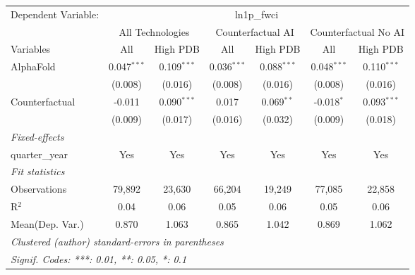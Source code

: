 \begingroup
\centering
\begin{tabular}{lcccccc}
   \tabularnewline \midrule \midrule
   Dependent Variable: & \multicolumn{6}{c}{ln1p\_fwci}\\
 & \multicolumn{2}{c}{All Technologies} & \multicolumn{2}{c}{Counterfactual AI} & \multicolumn{2}{c}{Counterfactual No AI} \\
\cmidrule(lr){1-1}\cmidrule(lr){2-3} \cmidrule(lr){4-5} \cmidrule(lr){6-7}
Variables & \multicolumn{1}{c}{All} & \multicolumn{1}{c}{High PDB} & \multicolumn{1}{c}{All} & \multicolumn{1}{c}{High PDB} & \multicolumn{1}{c}{All} & \multicolumn{1}{c}{High PDB} \\
\cmidrule(lr){1-1}\cmidrule(lr){2-2} \cmidrule(lr){3-3} \cmidrule(lr){4-4} \cmidrule(lr){5-5} \cmidrule(lr){6-6} \cmidrule(lr){7-7}
   AlphaFold      & 0.047$^{***}$ & 0.109$^{***}$ & 0.036$^{***}$ & 0.088$^{***}$ & 0.048$^{***}$ & 0.110$^{***}$\\   
                  & (0.008)       & (0.016)       & (0.008)       & (0.016)       & (0.008)       & (0.016)\\   
   Counterfactual & -0.011        & 0.090$^{***}$ & 0.017         & 0.069$^{**}$  & -0.018$^{*}$  & 0.093$^{***}$\\   
                  & (0.009)       & (0.017)       & (0.016)       & (0.032)       & (0.009)       & (0.018)\\   
   \midrule
   \emph{Fixed-effects}\\
   quarter\_year  & Yes           & Yes           & Yes           & Yes           & Yes           & Yes\\  
   \midrule
   \emph{Fit statistics}\\
   Observations   & 79,892        & 23,630        & 66,204        & 19,249        & 77,085        & 22,858\\  
   R$^2$          & 0.04          & 0.06          & 0.05          & 0.06          & 0.05          & 0.06\\  
Mean(Dep. Var.) & 0.870 & 1.063 & 0.865 & 1.042 & 0.869 & 1.062 \\
   \midrule \midrule
   \multicolumn{7}{l}{\emph{Clustered (author) standard-errors in parentheses}}\\
   \multicolumn{7}{l}{\emph{Signif. Codes: ***: 0.01, **: 0.05, *: 0.1}}\\
\end{tabular}
\par\endgroup

